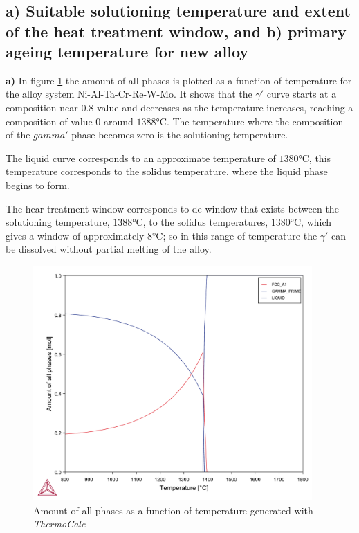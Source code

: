 \section{}

\subsection{a) Suitable solutioning temperature and extent of the heat treatment window, and b) primary ageing temperature for new alloy}

\textbf{a)} In figure \ref{fig:diagram05} the amount of all phases is plotted as a function of temperature for the alloy system Ni-Al-Ta-Cr-Re-W-Mo. It shows that the $\gamma'$ curve starts at a composition near $0.8$ value and decreases as the temperature increases, reaching a composition of value $0$ around $1388$°C. The temperature where the composition of the $gamma'$ phase becomes zero is the solutioning temperature. 

The liquid curve corresponds to an approximate temperature of $1380$°C, this temperature corresponds to the solidus temperature, where the liquid phase begins to form. 

The hear treatment window corresponds to de window that exists between the solutioning temperature, $1388$°C, to the solidus temperatures, $1380$°C, which gives a window of approximately $8$°C; so in this range of temperature the $\gamma'$ can be dissolved without partial melting of the alloy.

\begin{figure}[h]
  \centering
    \includegraphics[width=0.95\textwidth]{graficas/Q4_02.pdf}
    \caption{Amount of all phases as a function of temperature generated with \textit{ThermoCalc} \citep{thermocalc}}
    \label{fig:diagram05}
\end{figure}

